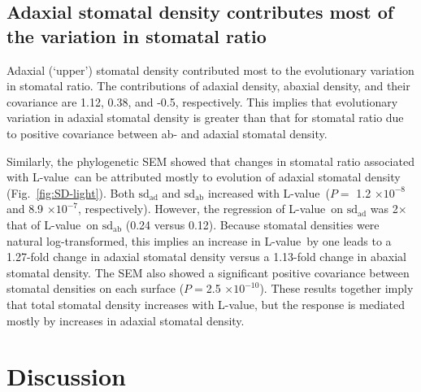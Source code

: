 \documentclass[12pt, oneside]{article}
\newcommand{\el}{L-value}
\begin{document}
\subsection*{Adaxial stomatal density contributes most of the variation in stomatal ratio}

Adaxial (`upper') stomatal density contributed most to the evolutionary variation in stomatal ratio. The contributions of adaxial density, abaxial density, and their covariance are 1.12, 0.38, and -0.5, respectively. This implies that evolutionary variation in adaxial stomatal density is greater than that for stomatal ratio due to positive covariance between ab- and adaxial stomatal density.

Similarly, the phylogenetic SEM showed that changes in stomatal ratio associated with \el~can be attributed mostly to evolution of adaxial stomatal density (Fig.~\ref{fig:SD-light}). Both $\mathrm{sd_{ad}}$ and $\mathrm{sd_{ab}}$ increased with \el~($P =$ 1.2 $\times10^{-8}$ and 8.9 $\times10^{-7}$, respectively). However, the regression of \el~on $\mathrm{sd_{ad}}$ was 2$\times$ that of \el~on $\mathrm{sd_{ab}}$ (0.24 versus 0.12). Because stomatal densities were natural log-transformed, this implies an increase in \el~by one leads to a 1.27-fold change in adaxial stomatal density versus a 1.13-fold change in abaxial stomatal density. The SEM also showed a significant positive covariance between stomatal densities on each surface ($P = $2.5 $\times10^{-10}$). These results together imply that total stomatal density increases with \el, but the response is mediated mostly by increases in adaxial stomatal density.



\section*{Discussion}
\end{document}
